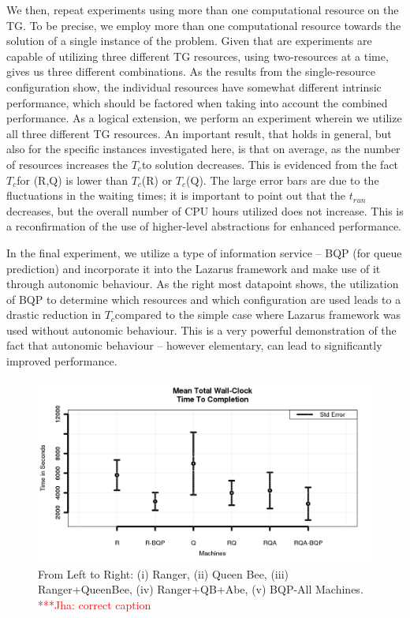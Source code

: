 \documentclass[conference,final]{IEEEtran}
\newcommand{\tc}{$T_c$}
\newcommand{\jhanote}[1]{ {\textcolor{red} { ***Jha: #1 }}}
\newcommand{\jhanote}[1]{}
\begin{document}
We then, repeat experiments using more than one computational resource
on the TG. To be precise, we employ more than one computational
resource towards the solution of a single instance of the problem.
Given that are experiments are capable of utilizing three different TG
resources, using two-resources at a time, gives us three different
combinations. As the results from the single-resource configuration
show, the individual resources have somewhat different intrinsic
performance, which should be factored when taking into account the
combined performance. As a logical extension, we perform an experiment
wherein we utilize all three different TG resources.  An important
result, that holds in general, but also for the specific instances
investigated here, is that on average, as the number of resources
increases the \tc to solution decreases. This is evidenced from the
fact \tc for (R,Q) is lower than \tc (R) or \tc (Q). The large error
bars are due to the fluctuations in the waiting times; it is important
to point out that the $t_{run}$ decreases, but the overall number of
CPU hours utilized does not increase. This is a reconfirmation of
the use of higher-level abstractions for enhanced performance.

In the final experiment, we utilize a type of information service --
BQP (for queue prediction) and incorporate it into the Lazarus
framework and make use of it through autonomic behaviour.  As the
right most datapoint shows, the utilization of BQP to determine which
resources and which configuration are used leads to a drastic
reduction in \tc compared to the simple case where Lazarus framework
was used without autonomic behaviour. This is a very powerful
demonstration of the fact that autonomic behaviour -- however
elementary, can lead to significantly improved performance.


\begin{figure}
\begin{center}
\includegraphics[scale=0.40]{./figures/Figure7.png}
\end{center}
\caption{From Left to Right: (i) Ranger, (ii) Queen Bee, (iii)
  Ranger+QueenBee, (iv) Ranger+QB+Abe, (v) BQP-All Machines. \jhanote{correct caption}}
\label{fig:application_architecture}
\end{figure}
\end{document}
